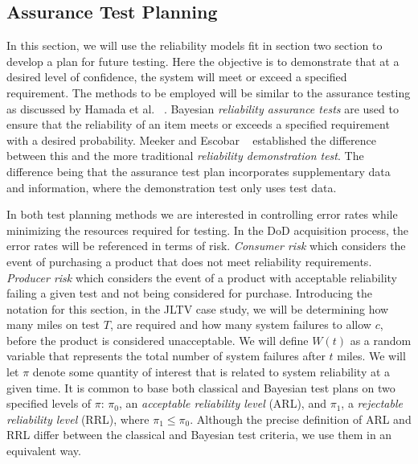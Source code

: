 \documentclass[12pt]{article}
\begin{document}
\subsection{Assurance Test Planning}
In this section, we will use the reliability models fit in section two section
to develop a plan for future testing.  Here the objective is to demonstrate that
at a desired level of confidence, the system will meet or exceed a specified
requirement. The methods to be employed will be similar to the assurance testing
as discussed by Hamada et al. ~\cite{ref5}. Bayesian \emph{reliability assurance
tests} are used to ensure that the reliability of an item meets or exceeds a
specified requirement with a desired probability. Meeker and Escobar
~\cite{ref6} established the difference between this and the more traditional
\emph{reliability demonstration test}.  The difference being that the assurance
test plan incorporates supplementary data and information, where the
demonstration test only uses test data.

In both test planning methods we are interested in controlling error rates while
minimizing the resources required for testing.  In the DoD acquisition process,
the error rates will be referenced in terms of risk. \emph{Consumer risk} which
considers the event of purchasing a product that does not meet reliability
requirements.  \emph{Producer risk} which considers the event of a product with
acceptable reliability failing a given test and not being considered for
purchase.  Introducing the notation for this section, in the JLTV case study, we
will be determining how many miles on test $T$, are required and how many system
failures to allow $c$, before the product is considered unacceptable.  We will
define $W(t)$ as a random variable that represents the total number of system
failures after $t$ miles.  We will let $\pi$ denote some quantity of interest
that is related to system reliability at a given time. It is common to base both
classical and Bayesian test plans on two specified levels of $\pi$: $\pi_0$, an
\emph{acceptable reliability level} (ARL), and $\pi_1$, a \emph{rejectable
reliability level} (RRL), where $\pi_1 \leq  \pi_0$. Although the precise
definition of ARL and RRL differ between the classical and Bayesian test
criteria, we use them in an equivalent way.
\end{document}
